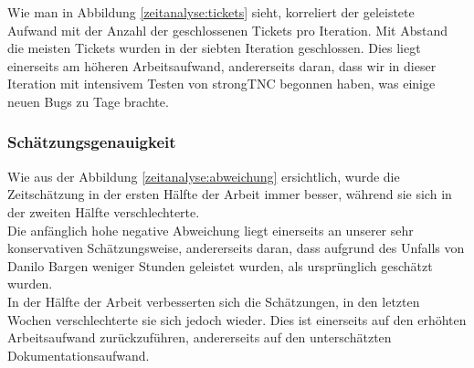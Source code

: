 Wie man in Abbildung \ref{zeitanalyse:tickets} sieht, korreliert der geleistete
Aufwand mit der Anzahl der geschlossenen Tickets pro Iteration. Mit
Abstand die meisten Tickets wurden in der siebten Iteration geschlossen. Dies
liegt einerseits am höheren Arbeitsaufwand, andererseits daran, dass wir in
dieser Iteration mit intensivem Testen von strongTNC begonnen haben, was einige
neuen Bugs zu Tage brachte.

\subsubsection{Schätzungsgenauigkeit}

Wie aus der Abbildung \ref{zeitanalyse:abweichung} ersichtlich, wurde die
Zeitschätzung in der ersten Hälfte der Arbeit immer besser, während sie sich in
der zweiten Hälfte verschlechterte. \\
Die anfänglich hohe negative Abweichung liegt einerseits an unserer sehr
konservativen Schätzungsweise, andererseits daran, dass aufgrund des Unfalls von
Danilo Bargen weniger Stunden geleistet wurden, als ursprünglich geschätzt
wurden. \\
In der Hälfte der Arbeit verbesserten sich die Schätzungen, in den letzten
Wochen verschlechterte sie sich jedoch wieder. Dies ist einerseits auf den
erhöhten Arbeitsaufwand zurückzuführen, andererseits auf den unterschätzten
Dokumentationsaufwand.

